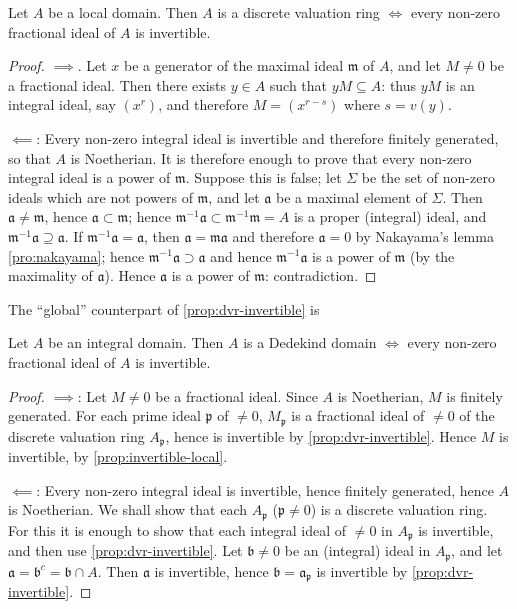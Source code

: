 \begin{proposition}\label{prop:dvr-invertible}
Let $A$ be a local domain. Then $A$ is a discrete valuation ring $\iff$ every non-zero fractional ideal of $A$ is invertible.
\end{proposition}

\begin{proof}
$\implies$. Let $x$ be a generator of the maximal ideal $\mathfrak{m}$ of $A$, and let $M \neq 0$ be a fractional ideal. Then there exists $y \in A$ such that $yM \subseteq A$: thus $yM$ is an integral ideal, say $(x^r)$, and therefore $M = (x^{r-s})$ where $s = v(y)$.

$\impliedby$: Every non-zero integral ideal is invertible and therefore finitely generated, so that $A$ is Noetherian. It is therefore enough to prove that every non-zero integral ideal is a power of $\mathfrak{m}$. Suppose this is false; let $\Sigma$ be the set of non-zero ideals which are not powers of $\mathfrak{m}$, and let $\mathfrak{a}$ be a maximal element of $\Sigma$. Then $\mathfrak{a} \neq \mathfrak{m}$, hence $\mathfrak{a} \subset \mathfrak{m}$; hence $\mathfrak{m}^{-1}\mathfrak{a} \subset \mathfrak{m}^{-1}\mathfrak{m} = A$ is a proper (integral) ideal, and $\mathfrak{m}^{-1}\mathfrak{a} \supseteq \mathfrak{a}$. If $\mathfrak{m}^{-1}\mathfrak{a} = \mathfrak{a}$, then $\mathfrak{a} = \mathfrak{m}\mathfrak{a}$ and therefore $\mathfrak{a} = 0$ by Nakayama's lemma \eqref{pro:nakayama}; hence $\mathfrak{m}^{-1}\mathfrak{a} \supset \mathfrak{a}$ and hence $\mathfrak{m}^{-1}\mathfrak{a}$ is a power of $\mathfrak{m}$ (by the maximality of $\mathfrak{a}$). Hence $\mathfrak{a}$ is a power of $\mathfrak{m}$: contradiction.
\end{proof}

The ``global'' counterpart of \eqref{prop:dvr-invertible} is 
\begin{theorem}\label{thm:dedekind-invertible}
Let $A$ be an integral domain. Then $A$ is a Dedekind domain $\iff$ every non-zero fractional ideal of $A$ is invertible.
\end{theorem}

\begin{proof}
$\implies$: Let $M \neq 0$ be a fractional ideal. Since $A$ is Noetherian, $M$ is finitely generated. For each prime ideal $\mathfrak{p}$ of $\neq 0$, $M_{\mathfrak{p}}$ is a fractional ideal of $\neq 0$ of the discrete valuation ring $A_{\mathfrak{p}}$, hence is invertible by \eqref{prop:dvr-invertible}. Hence $M$ is invertible, by \eqref{prop:invertible-local}.

$\impliedby$: Every non-zero integral ideal is invertible, hence finitely generated, hence $A$ is Noetherian. We shall show that each $A_{\mathfrak{p}}$ ($\mathfrak{p} \neq 0$) is a discrete valuation ring. For this it is enough to show that each integral ideal of $\neq 0$ in $A_{\mathfrak{p}}$ is invertible, and then use \eqref{prop:dvr-invertible}. Let $\mathfrak{b} \neq 0$ be an (integral) ideal in $A_{\mathfrak{p}}$, and let $\mathfrak{a} = \mathfrak{b}^c = \mathfrak{b} \cap A$. Then $\mathfrak{a}$ is invertible, hence $\mathfrak{b} = \mathfrak{a}_{\mathfrak{p}}$ is invertible by \eqref{prop:dvr-invertible}.
\end{proof}

